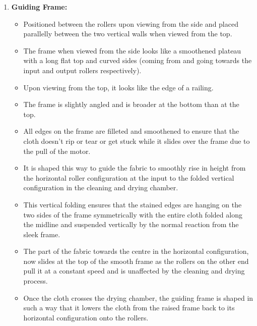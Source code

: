 \documentclass[table,french,english]{rapportCS}
\begin{document}
\begin{enumerate}[label=\arabic*.]
    \item \textbf{Guiding Frame:}
    \begin{itemize}[label=$\bullet$]
        \item Positioned between the rollers upon viewing from the side and placed parallelly between the two vertical walls when viewed from the top.
        \item The frame when viewed from the side looks like a smoothened plateau with a long flat top and curved sides (coming from and going towards the input and output rollers respectively).
        \item Upon viewing from the top, it looks like the edge of a railing.
        \item The frame is slightly angled and is broader at the bottom than at the top.
        \item All edges on the frame are \gls{filleted}  and smoothened to ensure that the cloth doesn’t rip or tear or get stuck while it slides over the frame due to the pull of the motor.
        \item It is shaped this way to guide the fabric to smoothly rise in height from the horizontal roller configuration at the input to the folded vertical configuration in the cleaning and drying chamber.
        \item This vertical folding ensures that the stained edges are hanging on the two sides of the frame symmetrically with the entire cloth folded along the midline and suspended vertically by the normal reaction from the sleek frame.
        \item The part of the fabric towards the centre in the horizontal configuration, now slides at the top of the smooth frame as the rollers on the other end pull it at a constant speed and is unaffected by the cleaning and drying process.
        \item Once the cloth crosses the drying chamber, the guiding frame is shaped in such a way that it lowers the cloth from the raised frame back to its horizontal configuration onto the rollers.
    \end{itemize}


\end{enumerate}
\end{document}
